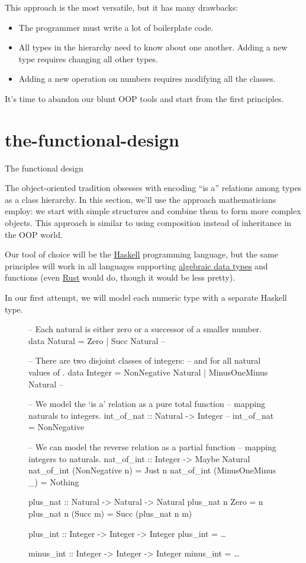 \documentclass{article}
\begin{document}
This approach is the most versatile, but it has many drawbacks:
\begin{itemize}
  \item The programmer must write a lot of boilerplate code.
  \item All types in the hierarchy need to know about one another.
  Adding a new type requires changing all other types.
  \item Adding a new operation on numbers requires modifying all the classes.
\end{itemize}

It's time to abandon our blunt OOP tools and start from the first principles.

\section{the-functional-design}{The functional design}

The object-oriented tradition obsesses with encoding ``is a'' relations among types as a class hierarchy.
In this section, we'll use the approach mathematicians employ: we start with simple structures and combine them to form more complex objects.
This approach is similar to using composition instead of inheritance in the OOP world.

Our tool of choice will be the \href{https://haskell.org/}{Haskell} programming language, but the same principles will work in all languages supporting \href{https://en.wikipedia.org/wiki/Algebraic_data_type}{algebraic data types} and functions (even \href{https://www.rust-lang.org/}{Rust} would do, though it would be less pretty).

In our first attempt, we will model each numeric type with a separate Haskell type.

\begin{figure}
\begin{code}[haskell]
-- Each natural is either zero or a successor of a smaller number.
data Natural = Zero | Succ Natural -- 

-- There are two disjoint classes of integers:
--  and  for all natural values of .
data Integer = NonNegative Natural | MinusOneMinus Natural -- 

-- We model the `is a' relation as a pure total function
-- mapping naturals to integers.
int_of_nat :: Natural -> Integer -- 
int_of_nat = NonNegative

-- We can model the reverse relation as a partial function
-- mapping integers to naturals.
nat_of_int :: Integer -> Maybe Natural
nat_of_int (NonNegative n) = Just n
nat_of_int (MinusOneMinus _) = Nothing

plus_nat :: Natural -> Natural -> Natural
plus_nat n Zero = n
plus_nat n (Succ m) = Succ (plus_nat n m)

plus_int :: Integer -> Integer -> Integer
plus_int = \ldots

minus_int :: Integer -> Integer -> Integer
minus_int = \ldots
\end{code}
\end{figure}
\end{document}
